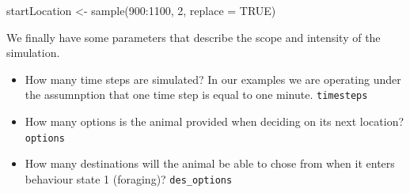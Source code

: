 \documentclass[10pt,a4paper]{article}
\newenvironment{Shaded}{}{}
\newcommand{\AttributeTok}[1]{#1}
\newcommand{\ConstantTok}[1]{#1}
\newcommand{\DecValTok}[1]{#1}
\newcommand{\FunctionTok}[1]{#1}
\newcommand{\NormalTok}[1]{#1}
\newcommand{\OtherTok}[1]{#1}
\newcommand{\SpecialCharTok}[1]{#1}
\providecommand{\tightlist}{%
  \setlength{\itemsep}{0pt}\setlength{\parskip}{0pt}}
\begin{document}
\begin{Shaded}
\begin{Highlighting}[]
\NormalTok{startLocation }\OtherTok{\textless{}{-}} \FunctionTok{sample}\NormalTok{(}\DecValTok{900}\SpecialCharTok{:}\DecValTok{1100}\NormalTok{, }\DecValTok{2}\NormalTok{, }\AttributeTok{replace =} \ConstantTok{TRUE}\NormalTok{)}
\end{Highlighting}
\end{Shaded}

We finally have some parameters that describe the scope and intensity of the simulation.

\begin{itemize}
\tightlist
\item
  How many time steps are simulated? In our examples we are operating under the assumnption that one time step is equal to one minute.
  \texttt{timesteps}
\item
  How many options is the animal provided when deciding on its next location?
  \texttt{options}
\item
  How many destinations will the animal be able to chose from when it enters behaviour state 1 (foraging)?
  \texttt{des\_options}
\end{itemize}
\end{document}
